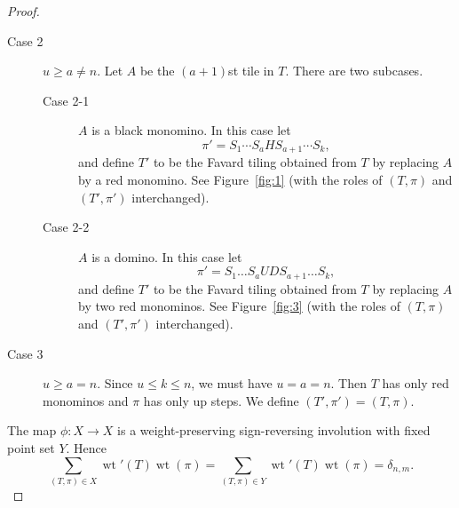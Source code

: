 \documentclass[oneside]{book}
\numberwithin{equation}{section}
\theoremstyle{definition}
\newcommand\wt{\operatorname{wt}}
\begin{document}
\begin{proof}
\begin{description}
\item[Case 2] \( u\ge a\ne n \). Let \( A \) be the \( (a+1) \)st tile
  in \( T \). There are two subcases.
  \begin{description}
  \item[Case 2-1] $A$ is a black monomino. In this case let
    \[
      \pi' = S_1\cdots S_a H S_{a+1} \cdots S_k,
    \]
and define $T'$ to be the Favard tiling obtained from $T$ by
replacing $A$ by a red monomino. See Figure~\ref{fig:1} (with the
roles of \( (T,\pi) \) and \( (T',\pi') \) interchanged).
\item[Case 2-2] $A$ is a domino. In this case let
  \[
    \pi' = S_1\dots S_a UD S_{a+1} \dots S_k,
  \]
and define $T'$ to be the Favard tiling obtained from $T$ by
replacing $A$ by two red monominos. See Figure~\ref{fig:3} (with
the roles of \( (T,\pi) \) and \( (T',\pi') \)
interchanged).
\end{description}
\item[Case 3] \( u\ge a = n \). Since \( u\le k\le n \), we must have \( u=a=n \).
  Then \( T \) has only red monominos and \( \pi \) has only up steps.
  We define \( (T',\pi') = (T,\pi) \).
\end{description}

The map \( \phi:X \to X \) is a weight-preserving sign-reversing
involution with fixed point set \( Y \). Hence
\[
  \sum_{(T,\pi)\in X} \wt'(T) \wt(\pi) = \sum_{(T,\pi)\in Y} \wt'(T)
  \wt(\pi) = \delta_{n,m}.
\]
\end{proof}
\end{document}
